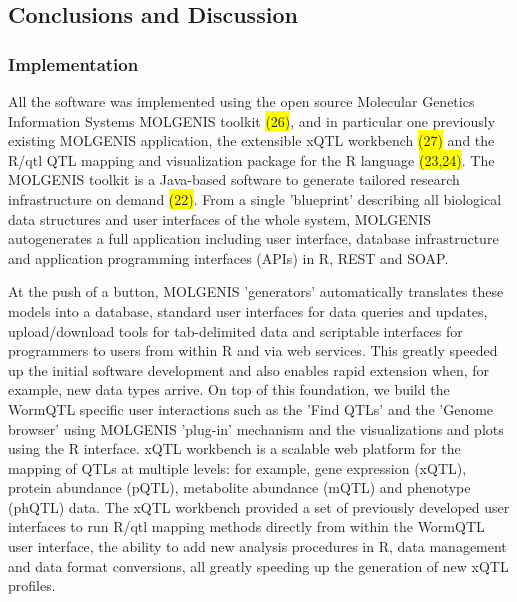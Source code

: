 \subsection{Conclusions and Discussion}
\subsubsection{Implementation}
All the software was implemented using the open source Molecular Genetics Information Systems 
MOLGENIS toolkit \colorbox{yellow}{(26)}, and in particular one previously existing MOLGENIS application, the 
extensible xQTL workbench \colorbox{yellow}{(27)} and the R/qtl QTL mapping and visualization package for the R 
language \colorbox{yellow}{(23,24)}. The MOLGENIS toolkit is a Java-based software to generate tailored research 
infrastructure on demand \colorbox{yellow}{(22)}. From a single 'blueprint' describing all biological data 
structures and user interfaces of the whole system, MOLGENIS autogenerates a full application 
including user interface, database infrastructure and application programming interfaces 
(APIs) in R, REST and SOAP.

At the push of a button, MOLGENIS 'generators' automatically translates these models into a 
database, standard user interfaces for data queries and updates, upload/download tools for 
tab-delimited data and scriptable interfaces for programmers to users from within R and via 
web services. This greatly speeded up the initial software development and also enables rapid 
extension when, for example, new data types arrive. On top of this foundation, we build the 
WormQTL specific user interactions such as the 'Find QTLs' and the 'Genome browser' using 
MOLGENIS 'plug-in' mechanism and the visualizations and plots using the R interface. xQTL 
workbench is a scalable web platform for the mapping of QTLs at multiple levels: for example, 
gene expression (xQTL), protein abundance (pQTL), metabolite abundance (mQTL) and phenotype 
(phQTL) data. The xQTL workbench provided a set of previously developed user interfaces to 
run R/qtl mapping methods directly from within the WormQTL user interface, the ability to 
add new analysis procedures in R, data management and data format conversions, all greatly 
speeding up the generation of new xQTL profiles.

